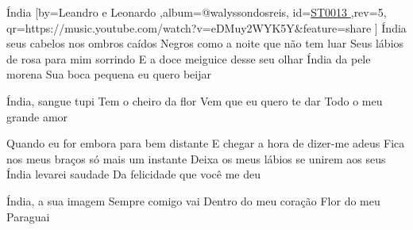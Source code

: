 \beginsong
{Índia %
}[by={Leandro e Leonardo %
},album={@walyssondosreis},
id={\href{https://music.youtube.com/watch?v=eDMuy2WYK5Y&feature=share %
}{ST0013 %
}},rev={5}, %
qr={https://music.youtube.com/watch?v=eDMuy2WYK5Y&feature=share %
}]
\beginverse
Índia seus cabelos nos ombros caídos
Negros como a noite que não tem luar
Seus lábios de rosa para mim sorrindo
E a doce meiguice desse seu olhar
Índia da pele morena
Sua boca pequena eu quero beijar
\endverse

\beginchorus
Índia, sangue tupi
Tem o cheiro da flor
Vem que eu quero te dar
Todo o meu grande amor
\endchorus

\beginverse
Quando eu for embora para bem distante
E chegar a hora de dizer-me adeus
Fica nos meus braços só mais um instante
Deixa os meus lábios se unirem aos seus
Índia levarei saudade
Da felicidade que você me deu
\endverse

\beginchorus
Índia, a sua imagem
Sempre comigo vai
Dentro do meu coração
Flor do meu Paraguai
\endchorus

